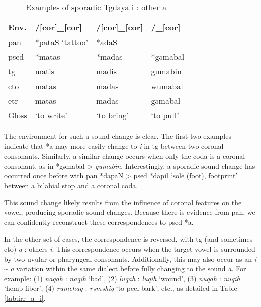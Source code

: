 \begin{table}[!htbp]
\centering
\caption{Examples of sporadic Tgdaya i : other a}
\label{tab:irr_i_a}
\begin{tabular}{llll}
\hline
Env.      & /[cor]\_[cor]   & /[cor]\_[cor] & /\_[cor]  \\ \hline
\ac{pan}  & *pataS `tattoo' & *adaS         &           \\ \hdashline
\ac{psed} & *matas          & *madas        & *gəmabal  \\ \hdashline
\ac{tg}   & matis           & madis         & gumabin   \\
\ac{cto}  & matas           & madas         & wumabal   \\
\ac{etr}  & matas           & madas         & gəmabal   \\ \hline
Gloss     & `to write'      & `to bring'    & `to pull' \\ \hline
\end{tabular}
\end{table}

The environment for such a sound change is clear. The first two examples indicate that *a may more easily change to \textit{i} in \acl{tg} between two coronal consonants. Similarly, a similar change occurs when only the coda is a coronal consonant, as in *gəmabal > \textit{gumabin}. Interestingly, a sporadic sound change has occurred once before with \ac{pan} *dapaN > \ac{psed} *dapil `sole (foot), footprint' between a bilabial stop and a coronal coda.

This sound change likely results from the influence of coronal features on the vowel, producing sporadic sound changes. Because there is evidence from \acl{pan}, we can confidently reconstruct these correspondences to \acl{psed} *a.

In the other set of cases, the correspondence is reversed, with \acl{tg} (and sometimes \acl{cto}) \textit{a} : others \textit{i}. This correspondence occurs when the target vowel is surrounded by two uvular or pharyngeal consonants. Additionally, this may also occur as an \textit{i} \~{} \textit{a} variation within the same dialect before fully changing to the sound \textit{a}. For example: (1) \textit{naqah} : \textit{naqih} `bad', (2) \textit{luqah} : \textit{luqih} `wound', (3) \textit{nuqah} : \textit{nuqih} `hemp fiber', (4) \textit{rumehaq} : \textit{rəməhiq} `to peel bark', etc., as detailed in Table \ref{tab:irr_a_i}.

